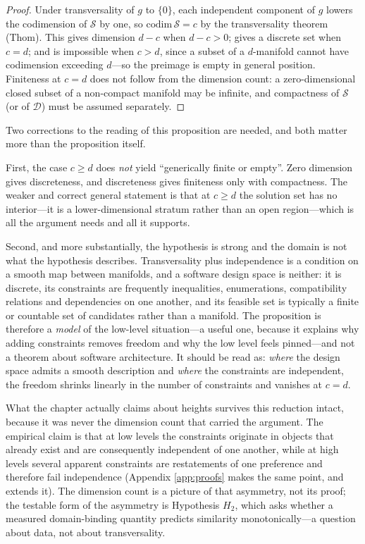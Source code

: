 \begin{proof}
Under transversality of $g$ to $\{0\}$, each independent component of $g$ lowers the codimension of
$\mathcal{S}$ by one, so $\mathrm{codim}\,\mathcal{S} = c$ by the transversality theorem (Thom). This
gives dimension $d - c$ when $d - c > 0$; gives a discrete set when $c = d$; and is impossible when
$c > d$, since a subset of a $d$-manifold cannot have codimension exceeding $d$---so the preimage is
empty in general position. Finiteness at $c = d$ does not follow from the dimension count: a
zero-dimensional closed subset of a non-compact manifold may be infinite, and compactness of
$\mathcal{S}$ (or of $\mathcal{D}$) must be assumed separately.
\end{proof}

Two corrections to the reading of this proposition are needed, and both matter more than the
proposition itself.

First, the case $c \ge d$ does \emph{not} yield ``generically finite or empty''. Zero dimension
gives discreteness, and discreteness gives finiteness only with compactness. The weaker and correct
general statement is that at $c \ge d$ the solution set has no interior---it is a lower-dimensional
stratum rather than an open region---which is all the argument needs and all it supports.

Second, and more substantially, the hypothesis is strong and the domain is not what the hypothesis
describes. Transversality plus independence is a condition on a smooth map between manifolds, and a
software design space is neither: it is discrete, its constraints are frequently inequalities,
enumerations, compatibility relations and dependencies on one another, and its feasible set is
typically a finite or countable set of candidates rather than a manifold. The proposition is
therefore a \emph{model} of the low-level situation---a useful one, because it explains why adding
constraints removes freedom and why the low level feels pinned---and not a theorem about software
architecture. It should be read as: \emph{where} the design space admits a smooth description and
\emph{where} the constraints are independent, the freedom shrinks linearly in the number of
constraints and vanishes at $c = d$.

What the chapter actually claims about heights survives this reduction intact, because it was never
the dimension count that carried the argument. The empirical claim is that at low levels the
constraints originate in objects that already exist and are consequently independent of one another,
while at high levels several apparent constraints are restatements of one preference and therefore
fail independence (Appendix \ref{app:proofs} makes the same point, and extends it). The dimension
count is a picture of that asymmetry, not its proof; the testable form of the asymmetry is
Hypothesis $H_2$, which asks whether a measured domain-binding quantity predicts similarity
monotonically---a question about data, not about transversality.

